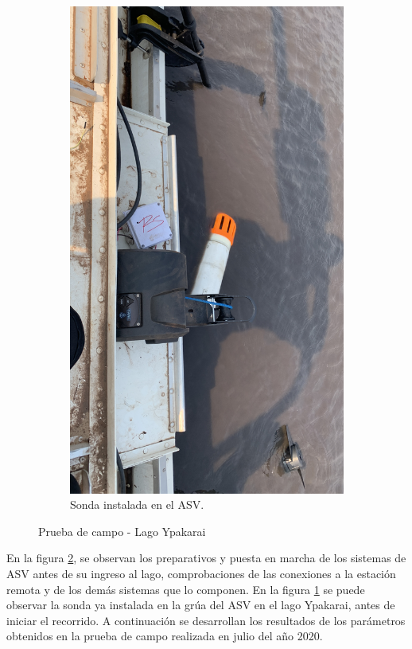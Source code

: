 \begin{figure}[h]
\begin{subfigure}[b]{0.3\textwidth}
         \includegraphics[width=\textwidth]{Imagenes/cap4/PruebaCampo1.JPG}
         \caption{Sonda instalada en el ASV.}
         \label{fig:SondaASV}
     \end{subfigure}
     \hfill
    \caption{Prueba de campo - Lago Ypakarai}
    \label{fig:PruebaCampo}
\end{figure}
En la figura \ref{fig:PruebaCampo}, se observan los preparativos y puesta en marcha de los sistemas de ASV antes de su ingreso al lago, comprobaciones de las conexiones a la estación remota y de los demás sistemas que lo componen. En la figura \ref{fig:SondaASV} se puede observar la sonda ya instalada en la gr\'ua del ASV en el lago Ypakarai, antes de iniciar el recorrido. 
A continuación se desarrollan los resultados de los parámetros obtenidos en la prueba de campo realizada en julio del año 2020.

